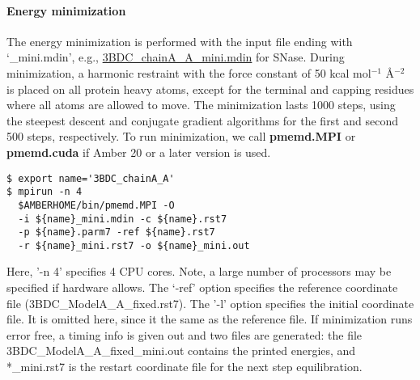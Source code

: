 \paragraph{Energy minimization}
The energy minimization is performed
with the input file ending with `\_mini.mdin',
e.g., 
\href{https://gitlab.com/shenlab-amber-cphmd/cphmd-tutorial/-/blob/main/gphmd_Amber/gphmd_snase_phrex/3BDC/3BDC_chainA_A_mini.mdin}{3BDC\_chainA\_A\_mini.mdin} for SNase.
During minimization, a harmonic restraint with the
force constant of 50 kcal mol$^{-1}$ \AA$^{-2}$ is placed
on all protein heavy atoms, except for the 
terminal and capping residues where all atoms are allowed to move. 
The minimization lasts 1000 steps, using the steepest descent and 
conjugate gradient algorithms for the first and second 500 steps, respectively. 
To run minimization, we call \textbf{pmemd.MPI} or \textbf{pmemd.cuda} if Amber 20 \cite{Case_Kollman_2020} or a later version is used.
\begin{lstlisting}
$ export name='3BDC_chainA_A'
$ mpirun -n 4 
  $AMBERHOME/bin/pmemd.MPI -O 
  -i ${name}_mini.mdin -c ${name}.rst7 
  -p ${name}.parm7 -ref ${name}.rst7 
  -r ${name}_mini.rst7 -o ${name}_mini.out
\end{lstlisting}
Here, '-n 4' specifies 4 CPU cores. Note, a large number of processors may be specified if hardware allows. 
The `-ref' option 
specifies the reference coordinate file
(3BDC\_ModelA\_A\_fixed.rst7).
The '-l' option specifies the initial coordinate file. It is omitted here, since it the same as the reference file.
If minimization runs error free, a timing info is given out
and two files are generated: 
the file 3BDC\_ModelA\_A\_fixed\_mini.out 
contains the printed energies, and 
*\_mini.rst7 is the restart coordinate file for the next step equilibration. 


